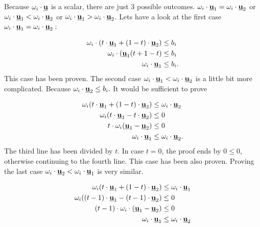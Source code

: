 \documentclass[a4paper,11pt,titlepage]{article}
\newcommand{\uvec}{\textbf{\underline{u}}}
\begin{document}
Because $\omega_i \cdot \uvec$ is a scalar, there are just 3 possible outcomes. $\omega_i \cdot \uvec_1 = \omega_i \cdot \uvec_2$ or $\omega_i \cdot \uvec_1 < \omega_i \cdot \uvec_2$ or $\omega_i \cdot \uvec_1 > \omega_i \cdot \uvec_2$. Lets have a look at the first case $\omega_i \cdot \uvec_1 = \omega_i \cdot \uvec_2:$


\begin{equation}
\begin{split}
\omega_i \cdot (t \cdot \uvec_1 + (1-t) \cdot \uvec_2) &\leq b_i\\
\omega_i \cdot (\uvec_1(t+1-t) &\leq b_i\\
\omega_i \cdot \uvec_1 &\leq b_i.
\end{split}
\end{equation}
This case has been proven. The second case $\omega_i \cdot \uvec_1 < \omega_i \cdot \uvec_2$ is a little bit more complicated. Because $\omega_i \cdot \uvec_2 \leq b_i.$ It would be sufficient to prove 

\begin{equation}
\label{eq:conv_proof_1_less_2}
\begin{split}
\omega_i(t \cdot \uvec_1 + (1-t) \cdot \uvec_2) &\leq \omega_i \cdot \uvec_2\\
\omega_i(t \cdot \uvec_1 -t \cdot \uvec_2) &\leq 0\\
t \cdot \omega_i(\uvec_1 - \uvec_2) &\leq 0\\
\omega_i \cdot \uvec_1 &\leq \omega_i \cdot \uvec_2.
\end{split}
\end{equation}
The third line has been divided by $t$. In case $t = 0$, the proof ends by $0 \leq 0$, otherwise continuing to the fourth line. This case has been also proven. Proving the last case $\omega_i \cdot \uvec_2 < \omega_i \cdot \uvec_1$ is very similar. 

\begin{equation}
\label{eq:conv_proof_2_less_1}
\begin{split}
\omega_i(t \cdot \uvec_1 + (1-t) \cdot \uvec_2) &\leq \omega_i \cdot \uvec_1\\
\omega_i((t - 1) \cdot \uvec_1 - (t - 1) \cdot \uvec_2) &\leq 0 \\
(t - 1) \cdot \omega_i \cdot (\uvec_1 - \uvec_2) &\leq 0 \\
\omega_i \cdot \uvec_1 &\leq \omega_i \cdot \uvec_2
\end{split}
\end{equation}
\end{document}
